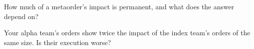 \begin{interviewq}\label{iq:mx:the-empirics-of-price-impact:5}
How much of a metaorder's impact is permanent, and what does the answer depend on?
\end{interviewq}

\begin{interviewq}\label{iq:mx:the-empirics-of-price-impact:6}
Your alpha team's orders show twice the impact of the index team's orders of the same size. Is their execution worse?
\end{interviewq}
